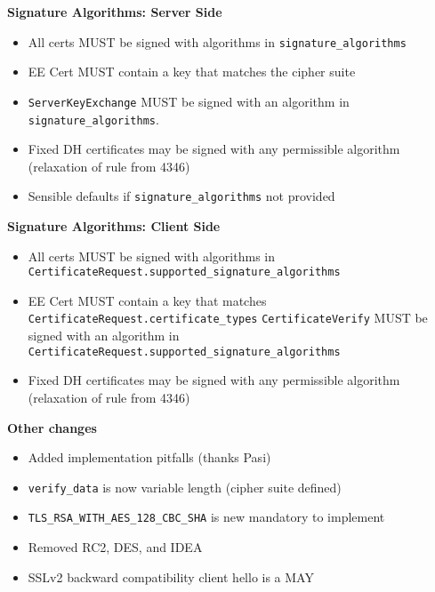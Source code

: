\documentclass[helvetica]{seminar}
\newcommand{\heading}[1]{%
  \begin{center} 
    \large\bf 
    #1 
  \end{center} 
  \vspace{.4 in}}
\begin{document}
\begin{slide}
\heading{Signature Algorithms: Server Side}
\begin{itemize}
\item All certs MUST be signed with algorithms in \verb^signature_algorithms^
\item EE Cert MUST contain a key that matches the cipher suite
\item \verb^ServerKeyExchange^ MUST be signed with an algorithm in
\verb^signature_algorithms^.
\item Fixed DH certificates may be signed with any permissible algorithm (relaxation of rule from 4346)
\item Sensible defaults if \verb^signature_algorithms^ not provided
\end{itemize}
\end{slide}


\begin{slide}
\heading{Signature Algorithms: Client Side}
\begin{itemize}
\item All certs MUST be signed with algorithms in \verb^CertificateRequest.supported_signature_algorithms^
\item EE Cert MUST contain a key that matches \verb^CertificateRequest.certificate_types^
\verb^CertificateVerify^ MUST be signed with an algorithm in
\verb^CertificateRequest.supported_signature_algorithms^
\item Fixed DH certificates may be signed with any permissible algorithm (relaxation of rule from 4346)
\end{itemize}
\end{slide}

\begin{slide}
\heading{Other changes}

\begin{itemize}
\item Added implementation pitfalls (thanks Pasi)
\item \verb^verify_data^ is now variable length (cipher suite defined)
\item \verb^TLS_RSA_WITH_AES_128_CBC_SHA^ is new mandatory to implement
\item Removed RC2, DES, and IDEA
\item SSLv2 backward compatibility client hello is a MAY
\end{itemize}

\end{slide}
\end{document}
